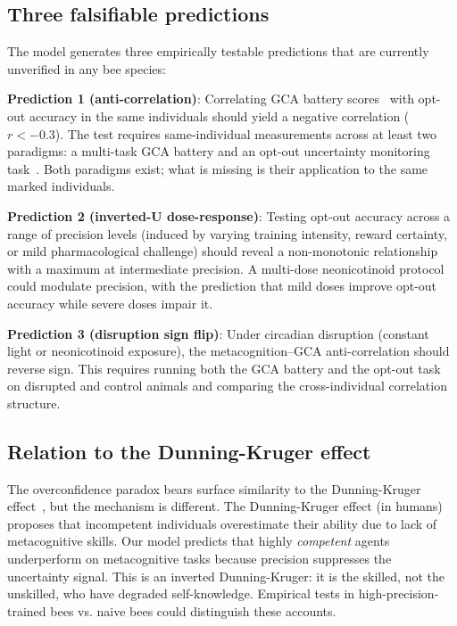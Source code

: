 \subsection*{Three falsifiable predictions}
\label{sec:disc:predictions}

The model generates three empirically testable predictions that are currently unverified in any bee
species:

\textbf{Prediction 1 (anti-correlation)}: Correlating GCA battery scores~\cite{AnimalCog2024} with
opt-out accuracy in the same individuals should yield a negative correlation ($r < -0.3$). The
test requires same-individual measurements across at least two paradigms: a multi-task GCA battery
and an opt-out uncertainty monitoring task~\cite{Giurfa2013}. Both paradigms exist; what is missing
is their application to the same marked individuals.

\textbf{Prediction 2 (inverted-U dose-response)}: Testing opt-out accuracy across a range of
precision levels (induced by varying training intensity, reward certainty, or mild pharmacological
challenge) should reveal a non-monotonic relationship with a maximum at intermediate precision.
A multi-dose neonicotinoid protocol~\cite{SciReports2020} could modulate precision, with the
prediction that mild doses improve opt-out accuracy while severe doses impair it.

\textbf{Prediction 3 (disruption sign flip)}: Under circadian disruption (constant light or
neonicotinoid exposure), the metacognition--GCA anti-correlation should reverse sign. This requires
running both the GCA battery and the opt-out task on disrupted and control animals and comparing
the cross-individual correlation structure.

\subsection*{Relation to the Dunning-Kruger effect}
\label{sec:disc:dunning}

The overconfidence paradox bears surface similarity to the Dunning-Kruger
effect~\cite{DunningKruger1999}, but the mechanism is different. The Dunning-Kruger effect
(in humans) proposes that incompetent individuals overestimate their ability due to lack of
metacognitive skills. Our model predicts that highly \emph{competent} agents underperform on
metacognitive tasks because precision suppresses the uncertainty signal. This is an inverted
Dunning-Kruger: it is the skilled, not the unskilled, who have degraded self-knowledge. Empirical
tests in high-precision-trained bees vs. naive bees could distinguish these accounts.

